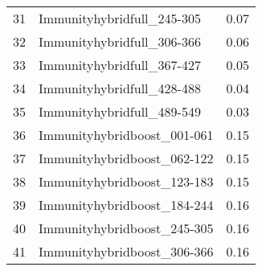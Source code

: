\begin{table}[ht]
\begin{tabular}{rlr}
  31 & Immunityhybridfull\_245-305 & 0.07 \\ 
  32 & Immunityhybridfull\_306-366 & 0.06 \\ 
  33 & Immunityhybridfull\_367-427 & 0.05 \\ 
  34 & Immunityhybridfull\_428-488 & 0.04 \\ 
  35 & Immunityhybridfull\_489-549 & 0.03 \\ 
  36 & Immunityhybridboost\_001-061 & 0.15 \\ 
  37 & Immunityhybridboost\_062-122 & 0.15 \\ 
  38 & Immunityhybridboost\_123-183 & 0.15 \\ 
  39 & Immunityhybridboost\_184-244 & 0.16 \\ 
  40 & Immunityhybridboost\_245-305 & 0.16 \\ 
  41 & Immunityhybridboost\_306-366 & 0.16 \\ 
   \hline
\end{tabular}
\end{table}
